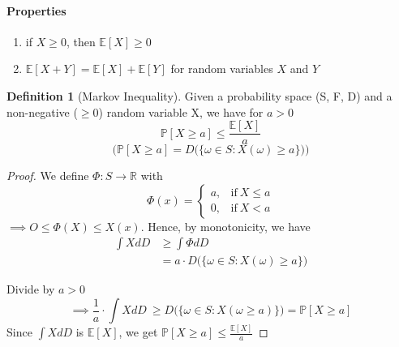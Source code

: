 \documentclass[10pt,a4paper]{article}
\theoremstyle{definition}
\newtheorem{definition}{Definition}[part]
\theoremstyle{plain}
\begin{document}
\paragraph{Properties}
\begin{enumerate}
	\item if $X\geq 0$, then $\mathbb{E}[X] \geq 0$
	\item $\mathbb{E}[X+Y] = \mathbb{E}[X] + \mathbb{E}[Y]$ for random variables $X$ and $Y$
\end{enumerate}
\begin{definition}[Markov Inequality]
	Given a probability space (S, F, D) and a non-negative ($\geq 0$) random variable X, we have for $ a > 0$ 
	$$ \mathbb{P}[X\geq a] \leq \frac{\mathbb{E}[X]}{a}$$
	$$ \Bigg( \mathbb{P}[X\geq a] = D\Big(\{\omega \in S: X(\omega) \geq a \} \Big)\Bigg)$$
\end{definition}
\begin{proof}
	We define $\Phi: S \to \mathbb{R}$ with
	$$ \Phi(x) = \begin{cases}
		a, & \text{if}\ X \leq a \\
		0, & \text{if}\ X < a
	\end{cases} $$
	$\implies O \leq \Phi(X) \leq X(x)$. Hence, by monotonicity, we have
	\begin{equation*}
	\begin{split}
		\int XdD &\geq \int \Phi dD\\
				&= a\cdot D\big( \{\omega \in S: X(\omega) \geq a\}\big)
	\end{split}		
	\end{equation*}
	
	Divide by $a>0$
	$$ \implies \frac{1}{a} \cdot \int XdD \ \geq D\big( \{\omega \in S: X(\omega \geq a) \} \big) = \mathbb{P}[X\geq a]$$
	Since $\int XdD$ is $\mathbb{E}[X]$, we get $\mathbb{P}[X\geq a]\leq \frac{\mathbb{E}[X]}{a}$
\end{proof}
%
\end{document}
